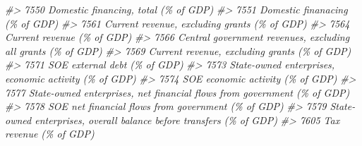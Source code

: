 \documentclass[
]{bxjsbook}
\newenvironment{Shaded}{\begin{snugshade}}{\end{snugshade}}
\newcommand{\CommentTok}[1]{\textcolor[rgb]{0.56,0.35,0.01}{\textit{#1}}}
\theoremstyle{definition}
\theoremstyle{definition}
\theoremstyle{definition}
\theoremstyle{definition}
\theoremstyle{remark}
\begin{document}
\begin{Shaded}
\begin{Highlighting}[]
\CommentTok{\#\textgreater{} 7550                                                                                                                                       Domestic financing, total (\% of GDP)}
\CommentTok{\#\textgreater{} 7551                                                                                                                                             Domestic finanacing (\% of GDP)}
\CommentTok{\#\textgreater{} 7561                                                                                                                               Current revenue, excluding grants (\% of GDP)}
\CommentTok{\#\textgreater{} 7564                                                                                                                                                 Current revenue (\% of GDP)}
\CommentTok{\#\textgreater{} 7566                                                                                                               Central government revenues, excluding all grants (\% of GDP)}
\CommentTok{\#\textgreater{} 7569                                                                                                                               Current revenue, excluding grants (\% of GDP)}
\CommentTok{\#\textgreater{} 7571                                                                                                                                               SOE external debt (\% of GDP)}
\CommentTok{\#\textgreater{} 7573                                                                                                                      State{-}owned enterprises, economic activity (\% of GDP)}
\CommentTok{\#\textgreater{} 7574                                                                                                                                           SOE economic activity (\% of GDP)}
\CommentTok{\#\textgreater{} 7577                                                                                                    State{-}owned enterprises, net financial flows from government (\% of GDP)}
\CommentTok{\#\textgreater{} 7578                                                                                                                         SOE net financial flows from government (\% of GDP)}
\CommentTok{\#\textgreater{} 7579                                                                                                       State{-}owned enterprises, overall balance before transfers (\% of GDP)}
\CommentTok{\#\textgreater{} 7605                                                                                                                                                     Tax revenue (\% of GDP)}

\end{Highlighting}
\end{Shaded}
\end{document}
